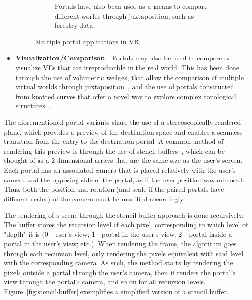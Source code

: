 \begin{itemize}
\begin{figure}[b]
\begin{subfigure}{.8\textwidth}
            \caption{Portals have also been used as a means to compare different worlds through juxtaposition, such as forestry data.~\cite{Nam2019}}
            \label{fig:avatars-ik-legs}
        \end{subfigure}
        \caption[Multiple portal applications in VR]{Multiple portal applications in \gls{VR}.}
        \label{fig:mappings}
    \end{figure}
    \item \textbf{Visualization/Comparison} - Portals may also be used to compare or visualize \glspl{VE} that are irreproducible in the 
    real world. This has been done through the use of volumetric wedges, that allow the comparison of multiple virtual worlds through 
    juxtaposition~\cite{Nam2019}, and the use of portals constructed from knotted curves that offer a novel way to explore complex topological 
    structures~\cite{Summermann2021}.
\end{itemize}

The aforementioned portal variants share the use of a stereoscopically rendered plane, which provides a preview of the destination 
space and enables a seamless transition from the entry to the destination portal. A common method of rendering this preview is through the use of 
stencil buffers~\cite{Murray2019}, which can be thought of as a 2-dimensional arrays that are the same size
as the user's screen. Each portal has an associated camera that is placed relatively with the user's camera and the opposing side of 
the portal, as if the user position was mirrored. Thus, both the position and rotation (and scale if the paired portals have different scales) of 
the camera must be modified accordingly. 

The rendering of a scene through the stencil buffer approach is done recursively. The buffer stores the recursion level of each pixel, corresponding 
to which level of "depth" it is (0 - user's view; 1 - portal in the user's view; 2 - portal inside a portal in the user's view; etc.). When rendering the 
frame, the algorithm goes through each recursion level, only rendering the pixels equivalent with said level with the corresponding camera. As such, 
the method starts by rendering the pixels outside a portal through the user's camera, then it renders the portal's view through the portal's camera, 
and so on for all recursion levels. Figure~\ref{fig:stencil-buffer} exemplifies a simplified version of a stencil buffer.

